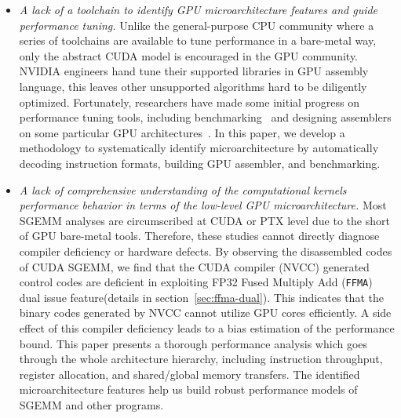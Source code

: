 \begin{itemize}
\item {\em A lack of a toolchain to identify GPU microarchitecture features and guide performance tuning.}
  Unlike the general-purpose CPU community where a series of toolchains are available to tune performance in a bare-metal
  way, only the abstract CUDA model is encouraged in the GPU community. 
  NVIDIA engineers hand tune their supported %
  libraries in GPU assembly language, this leaves other unsupported algorithms hard to be diligently optimized.
  Fortunately, researchers have made some initial progress on performance tuning tools, including benchmarking~\cite{mei, volkov, wong} and designing assemblers on some particular GPU architectures~\cite{asfermi,bernstein2012usable,decuda,maxas}. %
In this paper, we develop a methodology to systematically identify 
microarchitecture by automatically decoding instruction formats, building GPU assembler, and benchmarking.

\item {\em A lack of comprehensive understanding of the computational kernels performance behavior in terms of the low-level GPU microarchitecture.} 
Most SGEMM analyses are circumscribed at CUDA or PTX level due to the short of GPU bare-metal tools. 
Therefore, these studies cannot directly diagnose compiler deficiency or hardware 
defects. 
By observing the disassembled codes of CUDA SGEMM, we find that the CUDA
compiler (NVCC) generated control codes are deficient in exploiting
FP32 Fused Multiply Add ({\tt FFMA}) dual issue feature(details in
section~\ref{sec:ffma-dual}). 
This indicates that the binary codes generated by NVCC cannot utilize GPU cores efficiently. %
A side effect of this compiler deficiency leads to a bias estimation of the performance bound. 
This paper presents a thorough performance analysis which goes through the whole architecture hierarchy, including instruction 
throughput, register allocation, and shared/global memory transfers. 
The identified microarchitecture features help us build robust performance models of SGEMM and other programs.
\end{itemize}


